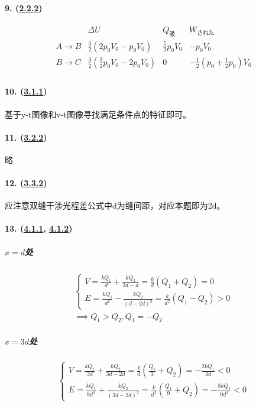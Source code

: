 \paragraph{9. (\hyperref[subsec:2.2.2]{2.2.2})}

\begin{equation*}
    \begin{array}{c|ccc}
        & \Delta U & Q_\textrm{吸} & W_\textrm{された} \\\hline
        A\to B & \frac32(2p_0V_0-p_0V_0) & \frac52p_0V_0 & -p_0V_0 \\
        B\to C & \frac32(\frac32p_0V_0-2p_0V_0) & 0 & -\frac12(p_0+\frac12p_0)V_0 \\
    \end{array}
\end{equation*}

\paragraph{10. (\hyperref[subsec:3.1.1]{3.1.1})} 基于y-t图像和v-t图像寻找满足条件点的特征即可。
\paragraph{11. (\hyperref[subsec:3.2.2]{3.2.2})} 略
\paragraph{12. (\hyperref[subsec:3.3.2]{3.3.2})} 应注意双缝干涉光程差公式中d为缝间距，对应本题即为2d。
\paragraph{13. (\hyperref[subsec:4.1.1]{4.1.1}, \hyperref[subsec:4.1.2]{4.1.2})}

\subparagraph{$x=d$处}

\begin{gather*}
    \begin{cases}
        V=\frac{kQ_1}{d}+\frac{kQ_2}{2d-d}=\frac{k}{d}(Q_1+Q_2)=0\\
        E=\frac{kQ_1}{d^2}-\frac{kQ_2}{(d-2d)^2}=\frac{k}{d^2}(Q_1-Q_2)>0
    \end{cases}\\\implies
    Q_1>Q_2,Q_1=-Q_2
\end{gather*}

\subparagraph{$x=3d$处}

\begin{equation*}
    \begin{cases}
        V=\frac{kQ_1}{3d}+\frac{kQ_2}{3d-2d}=\frac{k}{d}(\frac{Q_1}{3}+Q_2)=-\frac{2kQ_1}{3d}<0\\
        E=\frac{kQ_1}{9d^2}+\frac{kQ_2}{(3d-2d)^2}=\frac{k}{d^2}(\frac{Q_1}{9}+Q_2)=-\frac{8kQ_1}{9d^2}<0
    \end{cases}
\end{equation*}

